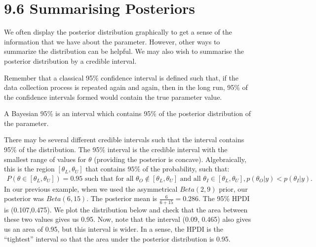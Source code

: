 \documentclass[letterpaper,10pt,english]{jupyterBook}
\begin{document}
\section{9.6 Summarising Posteriors}
\label{\detokenize{09.g. Bayesian Statistics I:summarising-posteriors}}\label{\detokenize{09.g. Bayesian Statistics I::doc}}
\sphinxAtStartPar
We often display the posterior distribution graphically to get a sense of the information that we have about the parameter. However, other ways to summarize the distribution can be helpful. We may also wish to summarise the posterior distribution by a credible interval.

\sphinxAtStartPar
Remember that a classical 95\%  confidence interval is defined such that, if the data collection process is repeated again and again, then in the long run, 95\% of the confidence intervals formed would contain the true parameter value.

\sphinxAtStartPar
A Bayesian 95\%  is an interval which contains 95\% of the posterior distribution of the parameter.

\sphinxAtStartPar
There may be several different credible intervals such that the interval contains 95\% of the distribution. The 95\%   interval is the credible interval with the smallest range of values for \(\theta\) (providing the posterior is concave). Algebraically, this is the region \([\theta_L, \theta_U]\) that contains \(95\%\) of the probability, such that:
\begin{equation*}
\begin{split}
P(\theta \in [\theta_L,\theta_U])= 0.95 \mbox{ such that for all } \theta_O \notin  [\theta_L,\theta_U] \mbox{ and all  } \theta_I\in[\theta_L,\theta_U], p(\theta_O|y) < p(\theta_I|y).
\end{split}
\end{equation*}
\sphinxAtStartPar
In our previous example, when we used the asymmetrical \(Beta(2, 9)\) prior, our posterior was \(Beta(6, 15)\). The posterior mean is  \(\frac{6}{6+15}=0.286\). The 95\% HPDI is (0.107,0.475). We plot the distribution below and check that the area between these two values gives us 0.95. Now, note that the interval (0.09, 0.465) also gives us an area of 0.95, but this interval is wider. In a sense, the HPDI is the “tightest” interval so that the area under the posterior distribution is 0.95.
\end{document}
